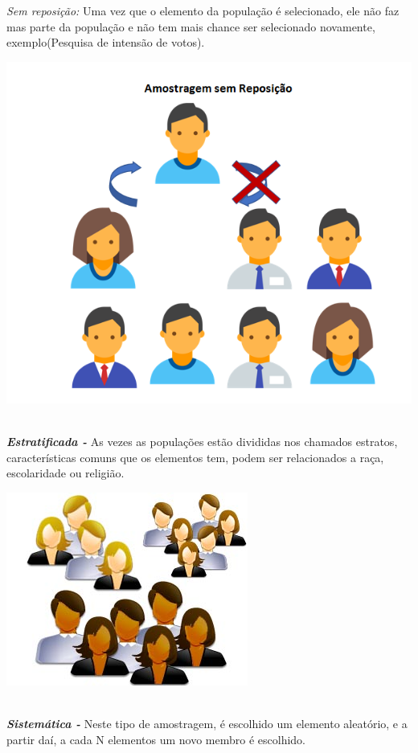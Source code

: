 \documentclass[12pt,a4paper]{article}
\begin{document}
\newpage

\textit{Sem reposição:}
Uma vez que o elemento da população é selecionado, ele não faz mas parte da população e não tem mais chance ser selecionado novamente, exemplo(Pesquisa de intensão de votos). 

{\centering \includegraphics[scale=0.45]{Amostragem/amostragemSemReposicao.png} \par}

\textbf{\textit{\\Estratificada -}}
As vezes as populações estão divididas nos chamados estratos, características comuns que os elementos tem, podem ser relacionados a raça, escolaridade ou religião.

{\centering \includegraphics[scale=0.45]{Amostragem/amostragemEstratificada.jpg} \par}

\textbf{\textit{\\Sistemática -}}
Neste tipo de amostragem, é escolhido um elemento aleatório, e a partir daí, a cada N elementos um novo membro é escolhido.
\end{document}

